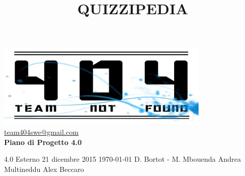 \documentclass[a4paper,11pt]{article}
\title{\textbf{{\fontsize{10mm}{6mm}\selectfont QUIZZIPEDIA}}}
\begin{document}
	\maketitle
	
	\begin{center}

	\includegraphics{../../team_not_found.jpg}\\	
	\fontsize{5mm}{3mm}\url{team404swe@gmail.com}\\
	\vspace{40mm}
	\textbf{ Piano di Progetto 4.0}
	\end{center}
	\thispagestyle{empty}	%
			{4.0} 							%
			{Esterno} 						%
			{21 dicembre 2015} 				%
			{\today} 						%
			{D. Bortot - M. Mbouenda}		%
			{Andrea Multineddu} 			%
			{Alex Beccaro} 				%
	
	\newpage
	\thispagestyle{empty}
	\null
	
	\newpage
	\fancyfoot[R]{\thepage}
\end{document}
